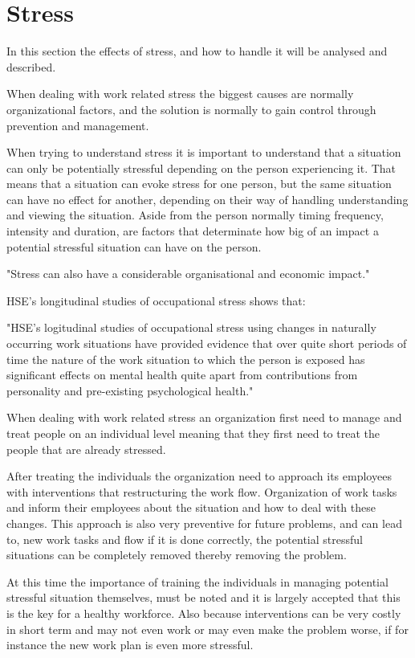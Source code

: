 \section{Stress}
In this section the effects of stress, and how to handle it will be analysed and described.

When dealing with work related stress the biggest causes are normally organizational factors, and the solution is normally to gain control through prevention and management.

When trying to understand stress it is important to understand that a situation can only be potentially stressful depending on the person experiencing it. That means that a situation can evoke stress for one person, but the same situation can have no effect for another, depending on their way of handling understanding and viewing the situation. Aside from the person normally timing frequency, intensity and duration, are factors that determinate how big of an impact a potential stressful situation can have on the person.

"Stress can also have a considerable organisational and economic impact."

HSE's longitudinal studies of occupational stress shows that:

"HSE's logitudinal studies of occupational stress using changes in naturally occurring work situations have provided evidence that over quite short periods of time the nature of the work situation to which the person is exposed has significant effects on mental health quite apart from contributions from personality and pre-existing psychological health."

When dealing with work related stress an organization first need to manage and treat people on an individual level meaning that they first need to treat the people that are already stressed\cite{control_stress_work}.

After treating the individuals the organization need to approach its employees with interventions that restructuring the work flow. Organization of work tasks and inform their employees about the situation and how to deal with these changes. This approach is also very preventive for future problems, and can lead to, new work tasks and flow if it is done correctly, the potential stressful situations can be completely removed thereby removing the problem.

At this time the importance of training the individuals in managing potential stressful situation themselves, must be noted and it is largely accepted that this is the key for a healthy workforce. Also because interventions can be very costly in short term and may not even work or may even make the problem worse, if for instance the new work plan is even more stressful.

